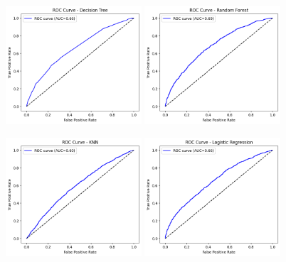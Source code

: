 \newpage

\begin{figure}[h!]
    \centering

    \includegraphics[width=0.45\textwidth]{images/rocDT.png}
    \includegraphics[width=0.45\textwidth]{images/rocRF.png}

    \includegraphics[width=0.45\textwidth]{images/rocKNN.png}
    \includegraphics[width=0.45\textwidth]{images/rocLR.png}


\end{figure}
